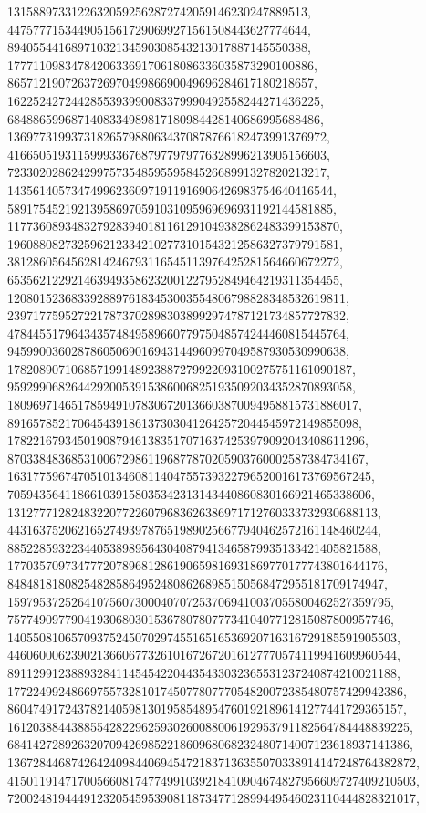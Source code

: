 \documentclass[12pt]{article}
\begin{document}
13158897331226320592562872742059146230247889513, 
44757771534490515617290699271561508443627774644, 
89405544168971032134590308543213017887145550388, 
177711098347842063369170618086336035873290100886, 
865712190726372697049986690049696284617180218657, 
1622524272442855393990083379990492558244271436225, 
6848865996871408334989817180984428140686995688486, 
13697731993731826579880634370878766182473991376972, 
41665051931159993367687977979776328996213905156603, 
72330202862429975735485955958452668991327820213217, 
143561405734749962360971911916906426983754640416544, 
589175452192139586970591031095969696931192144581885, 
1177360893483279283940181161291049382862483399153870, 
1960880827325962123342102773101543212586327379791581, 
3812860564562814246793116545113976425281564660672272, 
6535621229214639493586232001227952849464219311354455, 
12080152368339288976183453003554806798828348532619811, 
23971775952722178737028983038992974787121734857727832, 
47844551796434357484958966077975048574244460815445764, 
94599003602878605069016943144960997049587930530990638, 
178208907106857199148923887279922093100275751161090187, 
959299068264429200539153860068251935092034352870893058, 
1809697146517859491078306720136603870094958815731886017, 
8916578521706454391861373030412642572044545972149855098, 
17822167934501908794613835170716374253979092043408611296, 
87033848368531006729861196877870205903760002587384734167, 
163177596747051013460811404755739322796520016173769567245, 
705943564118661039158035342313143440860830166921465338606, 
1312777128248322077226079683626386971712760333732930688113, 
4431637520621652749397876519890256677940462572161148460244, 
8852285932234405389895643040879413465879935133421405821588, 
17703570973477720789681286190659816931869770177743801644176, 
84848181808254828586495248086268985150568472955181709174947, 
159795372526410756073000407072537069410037055800462527359795, 
757749097790419306803015367807807773410407712815087800957746, 
1405508106570937524507029745516516536920716316729185591905503, 
4460600062390213660677326101672672016127770574119941609960544, 
8911299123889328411454542204435433032365531237240874210021188, 
17722499248669755732810174507780777054820072385480757429942386, 
86047491724378214059813019585489547601921896141277441729365157, 
161203884438855428229625930260088006192953791182564784448839225, 
684142728926320709426985221860968068232480714007123618937141386, 
1367284468742642409844069454721837136355070338914147248764382872, 
4150119147170056608174774991039218410904674827956609727409210503, 
7200248194449123205459539081187347712899449546023110444828321017, 
\end{document}
